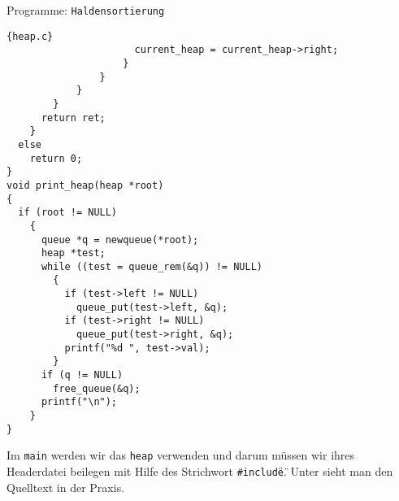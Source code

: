 \begin{myexampleprogram}{Programme: \texttt{Haldensortierung}}
\begin{lstlisting}{heap.c}
                      current_heap = current_heap->right;
                    }
                }
            }
        }
      return ret;
    }
  else
    return 0;
}
void print_heap(heap *root)
{
  if (root != NULL)
    {
      queue *q = newqueue(*root);
      heap *test;
      while ((test = queue_rem(&q)) != NULL)
        {
          if (test->left != NULL)
            queue_put(test->left, &q);
          if (test->right != NULL)
            queue_put(test->right, &q);
          printf("%d ", test->val);
        }
      if (q != NULL)
        free_queue(&q);
      printf("\n");
    }
}
\end{lstlisting}
\end{myexampleprogram}
Im \texttt{main} werden wir das \texttt{heap} verwenden
und darum müssen wir ihres Headerdatei beilegen mit Hilfe
des Strichwort \texttt{\#include\"{}\"{}}. Unter sieht man den
Quelltext in der Praxis.
